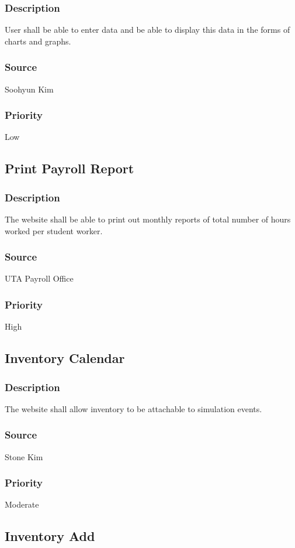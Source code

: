 \subsubsection{Description}
User shall be able to enter data and be able to display this data in the forms of charts and graphs.
\subsubsection{Source}
Soohyun Kim
\subsubsection{Priority}
Low

\subsection{Print Payroll Report}
\subsubsection{Description}
The website shall be able to print out monthly reports of total number of hours worked per student worker.
\subsubsection{Source}
UTA Payroll Office
\subsubsection{Priority}
High

\subsection{Inventory Calendar}
\subsubsection{Description}
The website shall allow inventory to be attachable to simulation events.
\subsubsection{Source}
Stone Kim
\subsubsection{Priority}
Moderate

\subsection{Inventory Add}
